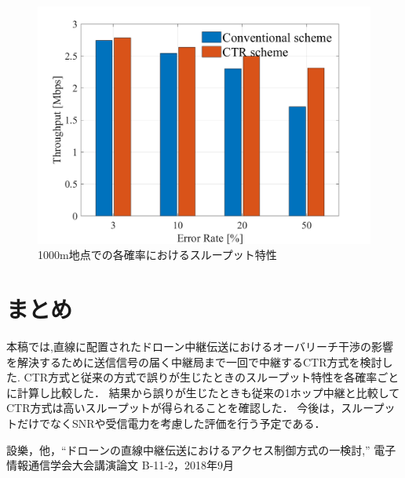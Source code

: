 \documentclass[a4paper,10pt]{ltjsarticle}
\begin{document}
\begin{figure}[H]
  \centering
  \includegraphics[width=\linewidth]{throughput_probabilistic_retry_v2.png} %
  \caption{1000m地点での各確率におけるスループット特性　}
  \label{fig:throughput_v2} %
\end{figure}

\section{まとめ}
本稿では,直線に配置されたドローン中継伝送におけるオーバリーチ干渉の影響を解決するために送信信号の届く中継局まで一回で中継するCTR方式を検討した.
CTR方式と従来の方式で誤りが生じたときのスループット特性を各確率ごとに計算し比較した．
結果から誤りが生じたときも従来の1ホップ中継と比較してCTR方式は高いスループットが得られることを確認した．
今後は，スループットだけでなくSNRや受信電力を考慮した評価を行う予定である．
\begin{thebibliography}{99}
  設樂，他，“ドローンの直線中継伝送におけるアクセス制御方式の一検討,” 電子情報通信学会大会講演論文 B‐11‐2，2018年9月
\end{thebibliography}

%
\end{document}

